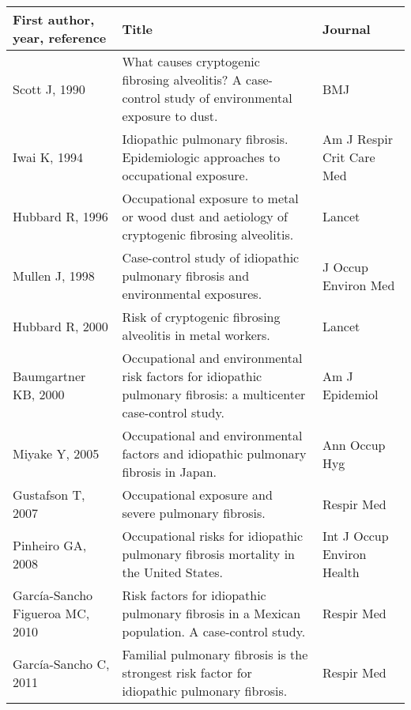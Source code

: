 \documentclass[a4
er,12pt]{article}
\begin{document}
\begin{table}
    \begin{tabular}{p{5cm}p{7cm}p{3cm}}
 	\textbf{First author, year, reference} &                                     \textbf{Title} &           \textbf{Journal} \\
	\midrule
                    Scott J, 1990\cite{Scott1990} &  What causes cryptogenic fibrosing alveolitis? A case-control study of environmental exposure to dust. &                         BMJ \\
                     Iwai K, 1994\cite{Iwai1994} &  Idiopathic pulmonary fibrosis. Epidemiologic approaches to occupational exposure. &   Am J Respir Crit Care Med \\
                  Hubbard R, 1996\cite{Hubbard1996} &  Occupational exposure to metal or wood dust and aetiology of cryptogenic fibrosing alveolitis. &                      Lancet \\
                   Mullen J, 1998\cite{Mullen1998} &  Case-control study of idiopathic pulmonary fibrosis and environmental exposures. &         J Occup Environ Med \\
                  Hubbard R, 2000\cite{Hubbard2000} &  Risk of cryptogenic fibrosing alveolitis in metal workers. &                      Lancet \\
             Baumgartner KB, 2000\cite{Baumgartner2000} &  Occupational and environmental risk factors for idiopathic pulmonary fibrosis: a multicenter case-control study. &              Am J Epidemiol \\
                   Miyake Y, 2005\cite{Miyake2005} &  Occupational and environmental factors and idiopathic pulmonary fibrosis in Japan. &               Ann Occup Hyg \\
                Gustafson T, 2007\cite{Gustafson2007} &  Occupational exposure and severe pulmonary fibrosis.  &                  Respir Med \\
                Pinheiro GA, 2008\cite{Pinheiro2008} &  Occupational risks for idiopathic pulmonary fibrosis mortality in the United States. &  Int J Occup Environ Health \\
        García-Sancho Figueroa MC, 2010\cite{Garcia-SanchoFigueroa2010} &  Risk factors for idiopathic pulmonary fibrosis in a Mexican population. A case-control study. &                  Respir Med \\
            García-Sancho C, 2011\cite{Garcia-Sancho2011} &  Familial pulmonary fibrosis is the strongest risk factor for idiopathic pulmonary fibrosis. &                  Respir Med \\

\end{tabular}
\end{table}
\end{document}
